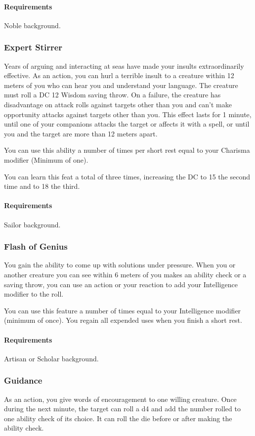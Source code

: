     \paragraph{Requirements} Noble background.
\subsubsection{Expert Stirrer} \label{feat::expertstirrer}
    Years of arguing and interacting at seas have made your insults extraordinarily effective.
    As an action, you can hurl a terrible insult to a creature within 12 meters of you who can hear you and understand your language.
    The creature must roll a DC 12 Wisdom saving throw.
    On a failure, the creature has disadvantage on attack rolls against targets other than you and can't make opportunity attacks against targets other than you.
    This effect lasts for 1 minute, until one of your companions attacks the target or affects it with a spell, or until you and the target are more than 12 meters apart.

    You can use this ability a number of times per short rest equal to your Charisma modifier (Minimum of one).

    You can learn this feat a total of three times, increasing the DC to 15 the second time and to 18 the third.
    \paragraph{Requirements} Sailor background.
\subsubsection{Flash of Genius} \label{feat::flashofgenius}
    You gain the ability to come up with solutions under pressure.
    When you or another creature you can see within 6 meters of you makes an ability check or a saving throw, you can use an action or your reaction to add your Intelligence modifier to the roll.

    You can use this feature a number of times equal to your Intelligence modifier (minimum of once).
    You regain all expended uses when you finish a short rest.
    \paragraph{Requirements} Artisan or Scholar background.
\subsubsection{Guidance} \label{feat::guidance}
    As an action, you give words of encouragement to one willing creature.
    Once during the next minute, the target can roll a d4 and add the number rolled to one ability check of its choice.
    It can roll the die before or after making the ability check.

